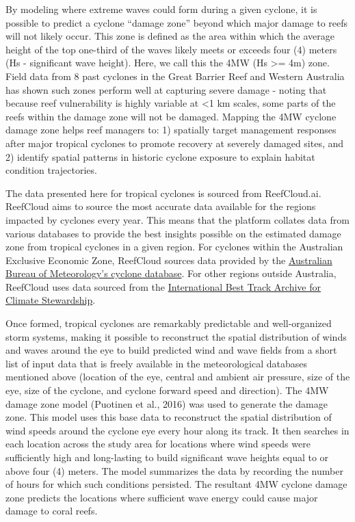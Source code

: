 \documentclass[
  letterpaper,
  DIV=11,
  numbers=noendperiod]{scrartcl}
\begin{document}
By modeling where extreme waves could form during a given cyclone, it is
possible to predict a cyclone ``damage zone'' beyond which major damage
to reefs will not likely occur. This zone is defined as the area within
which the average height of the top one-third of the waves likely meets
or exceeds four (4) meters (Hs - significant wave height). Here, we call
this the 4MW (Hs \textgreater= 4m) zone. Field data from 8 past cyclones
in the Great Barrier Reef and Western Australia has shown such zones
perform well at capturing severe damage - noting that because reef
vulnerability is highly variable at \textless1 km scales, some parts of
the reefs within the damage zone will not be damaged. Mapping the 4MW
cyclone damage zone helps reef managers to: 1) spatially target
management responses after major tropical cyclones to promote recovery
at severely damaged sites, and 2) identify spatial patterns in historic
cyclone exposure to explain habitat condition trajectories.

The data presented here for tropical cyclones is sourced from
ReefCloud.ai. ReefCloud aims to source the most accurate data available
for the regions impacted by cyclones every year. This means that the
platform collates data from various databases to provide the best
insights possible on the estimated damage zone from tropical cyclones in
a given region. For cyclones within the Australian Exclusive Economic
Zone, ReefCloud sources data provided by the
\href{http://www.bom.gov.au/cyclone/tropical-cyclone-knowledge-centre/databases/}{Australian
Bureau of Meteorology's cyclone database}. For other regions outside
Australia, ReefCloud uses data sourced from the
\href{https://www.ncdc.noaa.gov/ibtracs/}{International Best Track
Archive for Climate Stewardship}.

Once formed, tropical cyclones are remarkably predictable and
well-organized storm systems, making it possible to reconstruct the
spatial distribution of winds and waves around the eye to build
predicted wind and wave fields from a short list of input data that is
freely available in the meteorological databases mentioned above
(location of the eye, central and ambient air pressure, size of the eye,
size of the cyclone, and cyclone forward speed and direction). The 4MW
damage zone model (Puotinen et al., 2016) was used to generate the
damage zone. This model uses this base data to reconstruct the spatial
distribution of wind speeds around the cyclone eye every hour along its
track. It then searches in each location across the study area for
locations where wind speeds were sufficiently high and long-lasting to
build significant wave heights equal to or above four (4) meters. The
model summarizes the data by recording the number of hours for which
such conditions persisted. The resultant 4MW cyclone damage zone
predicts the locations where sufficient wave energy could cause major
damage to coral reefs.
\end{document}
